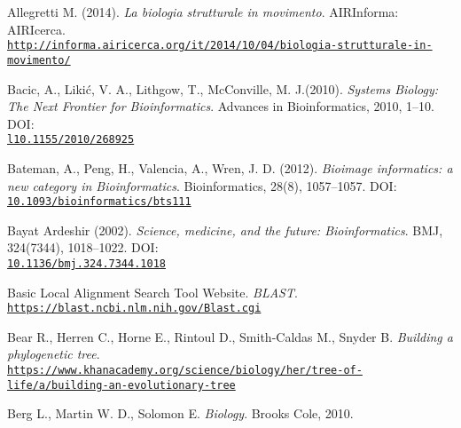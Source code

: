 \documentclass[twoside,openright,titlepage,fleqn,
,	headinclude,12pt,a4paper,BCOR5mm,footinclude,table]{scrbook}
\newcommand{\?}{'\-\nobreak\hspace{0pt}}
\begin{document}
\begin{thebibliography}{50}

Allegretti M. (2014).\newline
\textit{La biologia strutturale in movimento}. \newline
AIRInforma: AIRIcerca.
\\\texttt{\url{http://informa.airicerca.org/it/2014/10/04/biologia-strutturale-in-movimento/}}

Bacic, A., Likić, V. A., Lithgow, T., McConville, M. J.(2010).\newline 
\textit{Systems Biology: The Next Frontier for Bioinformatics}.\newline
Advances in Bioinformatics, 2010, 1–10. \newline
DOI: \\\texttt{\url{l10.1155/2010/268925}}

Bateman, A., Peng, H., Valencia, A., Wren, J. D. (2012).\newline
\textit{Bioimage informatics: a new category in Bioinformatics}. \newline
Bioinformatics, 28(8), 1057–1057. \newline
DOI: \\\texttt{\url{10.1093/bioinformatics/bts111}}

Bayat Ardeshir (2002).\newline
\textit{Science, medicine, and the future: Bioinformatics}.\newline
BMJ, 324(7344), 1018–1022.
DOI: \\\texttt{\url{10.1136/bmj.324.7344.1018}}

Basic Local Alignment Search Tool Website.\newline
\textit{BLAST}.
\\\texttt{\url{https://blast.ncbi.nlm.nih.gov/Blast.cgi}}

Bear R., Herren C., Horne E., Rintoul D., Smith-Caldas M., Snyder B. \newline
\textit{Building a phylogenetic tree}.
\\\texttt{\url{https://www.khanacademy.org/science/biology/her/tree-of-life/a/building-an-evolutionary-tree}}

Berg L., Martin W. D., Solomon E. \newline
\textit{Biology}.\newline
Brooks Cole, 2010.


\end{thebibliography}
\end{document}
